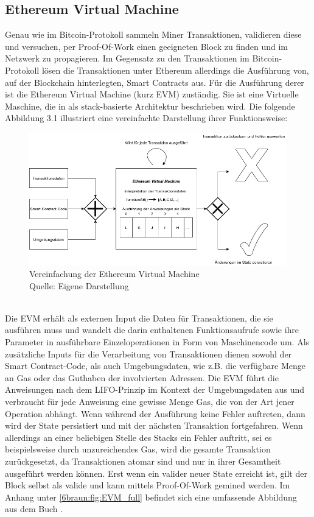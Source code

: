 \subsection{Ethereum Virtual Machine}
Genau wie im Bitcoin-Protokoll sammeln Miner Transaktionen, validieren diese und versuchen, per Proof-Of-Work einen geeigneten Block zu finden und im Netzwerk zu propagieren. 
Im Gegensatz zu den Transaktionen im Bitcoin-Protokoll lösen die Transaktionen unter Ethereum allerdings die Ausführung von, auf der Blockchain hinterlegten, Smart Contracts aus. 
Für die Ausführung derer ist die Ethereum Virtual Machine (kurz EVM) zuständig. 
Sie ist eine Virtuelle Maschine, die in  \cite{wood_yellowpaper_2014} als stack-basierte Architektur beschrieben wird. 
Die folgende Abbildung 3.1 illustriert eine vereinfachte Darstellung ihrer Funktionsweise: 
\begin{figure}[htpb]
	\centering
	\includegraphics[width=\textwidth]{images/evm_simple.png}
	\caption{Vereinfachung der Ethereum Virtual Machine\\
	Quelle: Eigene Darstellung}
	\label{6braun:fig:evm_simple}
\end{figure}\\

Die EVM erhält als externen Input die Daten für Transaktionen, die sie ausführen muss und wandelt die darin enthaltenen Funktionsaufrufe sowie ihre Parameter in ausführbare Einzeloperationen in Form von Maschinencode um. 
Als zusätzliche Inputs für die Verarbeitung von Transaktionen dienen sowohl der Smart Contract-Code, als auch Umgebungsdaten, wie z.B. die verfügbare Menge an Gas oder das Guthaben der involvierten Adressen. 
Die EVM führt die Anweisungen nach dem LIFO-Prinzip im Kontext der Umgebungsdaten aus und verbraucht für jede Anweisung eine gewisse Menge Gas, die von der Art jener Operation abhängt. Wenn während der Ausführung keine Fehler auftreten, dann wird der State persistiert und mit der nächsten Transaktion fortgefahren. 
Wenn allerdings an einer beliebigen Stelle des Stacks ein Fehler auftritt, sei es beispielsweise durch unzureichendes Gas, wird die gesamte Transaktion zurückgesetzt, da Transaktionen atomar sind und nur in ihrer Gesamtheit ausgeführt werden können. Erst wenn ein valider neuer State erreicht ist, gilt der Block selbst als valide und kann mittels Proof-Of-Work gemined werden. Im Anhang unter \ref{6braun:fig:EVM_full} befindet sich eine umfassende Abbildung aus dem Buch \cite{antanopoulos_2018}.
